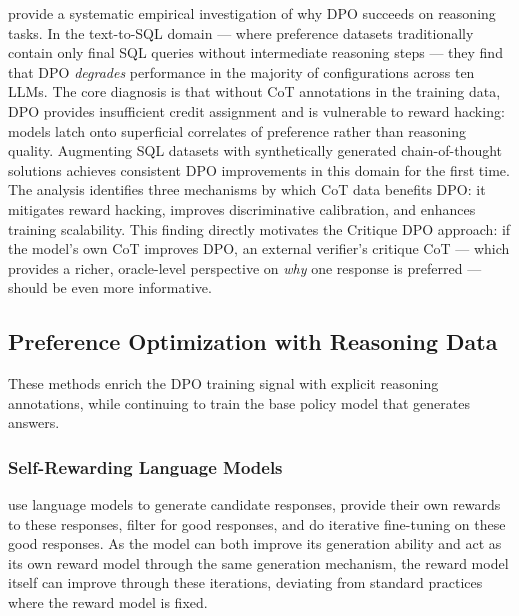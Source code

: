 \autocite{gao2025uncoveringimpactchainofthought} provide a systematic empirical investigation of why DPO succeeds on reasoning tasks. In the text-to-SQL domain --- where preference datasets traditionally contain only final SQL queries without intermediate reasoning steps --- they find that DPO \emph{degrades} performance in the majority of configurations across ten LLMs. The core diagnosis is that without CoT annotations in the training data, DPO provides insufficient credit assignment and is vulnerable to reward hacking: models latch onto superficial correlates of preference rather than reasoning quality. Augmenting SQL datasets with synthetically generated chain-of-thought solutions achieves consistent DPO improvements in this domain for the first time. The analysis identifies three mechanisms by which CoT data benefits DPO: it mitigates reward hacking, improves discriminative calibration, and enhances training scalability. This finding directly motivates the Critique DPO approach: if the model's own CoT improves DPO, an external verifier's critique CoT --- which provides a richer, oracle-level perspective on \emph{why} one response is preferred --- should be even more informative.

\subsection{Preference Optimization with Reasoning Data}
\label{sec:pref-opt}

These methods enrich the DPO training signal with explicit reasoning annotations, while continuing to train the base policy model that generates answers.

\subsubsection{Self-Rewarding Language Models}

\autocite{yuan2024selfrewardinglanguagemodels} use language models to generate candidate responses, provide their own rewards to these responses, filter for good responses, and do iterative fine-tuning on these good responses. As the model can both improve its generation ability and act as its own reward model through the same generation mechanism, the reward model itself can improve through these iterations, deviating from standard practices where the reward model is fixed.

